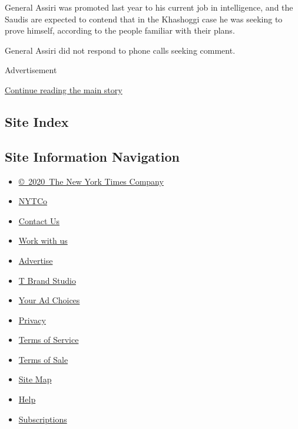 General Assiri was promoted last year to his current job in
intelligence, and the Saudis are expected to contend that in the
Khashoggi case he was seeking to prove himself, according to the people
familiar with their plans.

General Assiri did not respond to phone calls seeking comment.

Advertisement

\protect\hyperlink{after-bottom}{Continue reading the main story}

\hypertarget{site-index}{%
\subsection{Site Index}\label{site-index}}

\hypertarget{site-information-navigation}{%
\subsection{Site Information
Navigation}\label{site-information-navigation}}

\begin{itemize}
\tightlist
\item
  \href{https://help.nytimes.com/hc/en-us/articles/115014792127-Copyright-notice}{©~2020~The
  New York Times Company}
\end{itemize}

\begin{itemize}
\tightlist
\item
  \href{https://www.nytco.com/}{NYTCo}
\item
  \href{https://help.nytimes.com/hc/en-us/articles/115015385887-Contact-Us}{Contact
  Us}
\item
  \href{https://www.nytco.com/careers/}{Work with us}
\item
  \href{https://nytmediakit.com/}{Advertise}
\item
  \href{http://www.tbrandstudio.com/}{T Brand Studio}
\item
  \href{https://www.nytimes.com/privacy/cookie-policy\#how-do-i-manage-trackers}{Your
  Ad Choices}
\item
  \href{https://www.nytimes.com/privacy}{Privacy}
\item
  \href{https://help.nytimes.com/hc/en-us/articles/115014893428-Terms-of-service}{Terms
  of Service}
\item
  \href{https://help.nytimes.com/hc/en-us/articles/115014893968-Terms-of-sale}{Terms
  of Sale}
\item
  \href{https://spiderbites.nytimes.com}{Site Map}
\item
  \href{https://help.nytimes.com/hc/en-us}{Help}
\item
  \href{https://www.nytimes.com/subscription?campaignId=37WXW}{Subscriptions}
\end{itemize}
